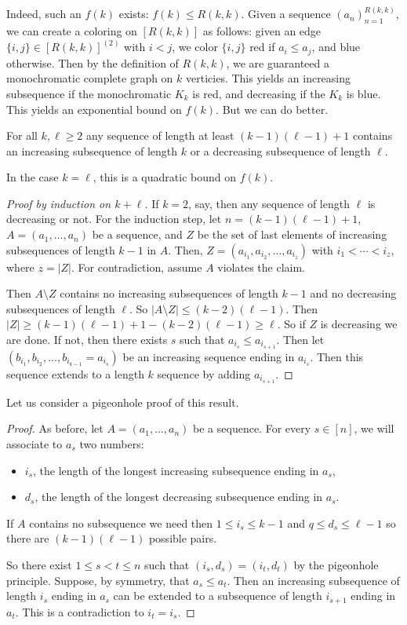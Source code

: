 Indeed, such an $f(k)$ exists: $f(k) \leq R(k,k)$. Given a sequence $(a_n)_{n=1}^{R(k,k)}$, we can create a coloring on $[R(k,k)]$ as follows: given an edge $\{i,j\}\in [R(k,k)]^{(2)}$  with $i<j$, we color $\{i,j\}$ red if $a_i\leq  a_j$, and blue otherwise. Then by the definition of $R(k,k)$, we are guaranteed  a monochromatic complete graph on $k$ verticies. This yields an increasing subsequence if the monochromatic $K_k$ is red, and decreasing if the $K_k$ is blue. This yields an exponential bound on $f(k)$. But we can do better.
\begin{theorem}
For all $k,\ell\geq 2$ any sequence of length at least $(k-1)(\ell-1)+1$ contains an increasing subsequence of length $k$ or a decreasing subsequence of length $\ell$.
\end{theorem}
\begin{remark}
In the case $k=\ell$, this is a quadratic bound on $f(k)$.
\end{remark}
\begin{proof}[Proof by induction on $k+\ell$]	
If $k=2$, say, then any sequence of length $\ell$ is decreasing or not.
For the induction step, let $n = (k-1)(\ell-1) + 1$,  $A=(a_1,\dotsc,a_n)$ be a sequence, and $Z$ be the set of last elements of increasing subsequences of length $k-1$ in $A$. Then, $Z = (a_{i_1},a_{i_2},\dotsc,a_{i_z})$ with $i_1< \dotsm < i_z$, where $z = |Z|$. For contradiction, assume $A$ violates the claim.

Then $A\setminus Z$ contains no increasing subsequences of length $k-1$ and no decreasing subsequences of length $\ell$. So $|A\setminus Z| \leq (k-2)(\ell-1)$. Then $|Z| \geq (k-1)(\ell-1)+1 - (k-2)(\ell-1)\geq \ell$. So if $Z$ is decreasing we are done. If not, then there exists $s$ such that $a_{i_s} \leq a_{i_{s+1}}$. Then let $(b_{i_1},b_{i_2},\dotsc,b_{i_{k-1}} = a_{i_s})$ be an increasing sequence ending in $a_{i_s}$. Then this sequence extends to a length $k$ sequence by adding $a_{i_{s+1}}$.
\end{proof}
Let us consider a pigeonhole proof of this result.
\begin{proof}	As before, let $A = (a_1,\dotsc,a_n)$ be a sequence.
For every $s\in[n]$, we will associate to $a_s$ two numbers:
\begin{itemize}
	\item $i_s$, the length of the longest increasing subsequence ending in $a_s$,
	\item $d_s$, the length of the longest decreasing subsequence ending in $a_s$. 
\end{itemize}
If $A$ contains no subsequence we need then $1\leq i_s\leq k-1$ and $q\leq d_s\leq \ell-1$ so there are $(k-1)(\ell-1)$ possible pairs.

So there exist $1\leq s<t \leq n$ such that $(i_s,d_s) = (i_t,d_t)$ by the pigeonhole principle. Suppose, by symmetry, that $a_s\leq a_t$. Then an increasing subsequence of length $i_s$ ending in $a_s$ can be extended to a subsequence of length $i_{s+1}$ ending in $a_t$. This is a contradiction to $i_t=i_s$.
\end{proof}


